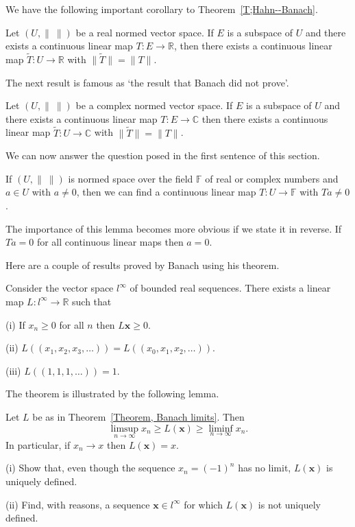 We have the following important corollary
to Theorem~\ref{T;Hahn--Banach}.
\begin{theorem} Let $(U,\|\ \|)$
be a real normed vector space.
If $E$ is a subspace of $U$ and there exists
a continuous linear map $T:E\rightarrow{\mathbb R}$,
then there exists 
a continuous linear map $\tilde{T}:U\rightarrow{\mathbb R}$
with $\|\tilde{T}\|=\|T\|$.
\end{theorem}
The next result is famous as `the result that
Banach did not prove'.
\begin{theorem} Let $(U,\|\ \|)$
be a complex normed vector space.
If $E$ is a subspace of $U$ and there exists
a continuous linear map $T:E\rightarrow{\mathbb C}$
then there exists 
a continuous linear map $\tilde{T}:U\rightarrow{\mathbb C}$
with $\|\tilde{T}\|=\|T\|$.
\end{theorem}
We can now answer the question posed in the first 
sentence of this section.
\begin{lemma} If $(U,\|\ \|)$ is
normed space over the field ${\mathbb F}$
of real or complex numbers
and $a\in U$ with $a\neq 0$, then
we can find a continuous linear map
$T:U\rightarrow{\mathbb F}$ with $Ta\neq 0$.
\end{lemma} 
The importance of this lemma becomes more obvious if
we state it in reverse. If $Ta=0$ for all continuous linear
maps then $a=0$.


Here are a couple of results proved by Banach using his theorem.
\begin{theorem}\label{Theorem, Banach limits}
Consider the vector space $l^{\infty}$ of bounded real
sequences. There exists a linear map $L:l^{\infty}\rightarrow {\mathbb R}$
such that

(i) If $x_{n}\geq 0$ for all $n$ then $L{\mathbf x}\geq 0$.

(ii) $L((x_{1},x_{2},x_{3},\dots))=L((x_{0},x_{1},x_{2},\dots))$.
                                                                
(iii) $L((1,1,1,\dots))=1$.
\end{theorem}
The theorem is illustrated by the following lemma.
\begin{lemma} Let $L$ be as in Theorem~\ref{Theorem, Banach limits}.
Then
\[\limsup_{n\rightarrow\infty}x_{n}\geq L({\mathbf x})
\geq \liminf_{n\rightarrow\infty}x_{n}.\]
In particular, if $x_{n}\rightarrow x$ then $L({\mathbf x})=x$.
\end{lemma}
\begin{exercise} (i) Show that, even though the sequence
$x_{n}=(-1)^{n}$ has no limit, $L({\mathbf x})$ is uniquely
defined.

(ii) Find, with reasons, a sequence ${\mathbf x}\in l^{\infty}$ 
for which $L({\mathbf x})$ is not uniquely
defined.
\end{exercise}

